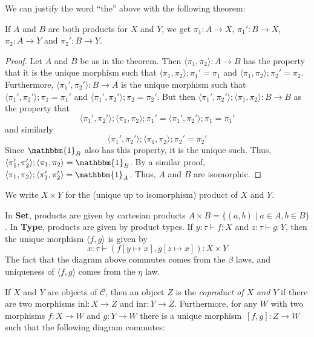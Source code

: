 \documentclass{lecturenotes}
\newcommand{\id}[1][]{\ensuremath{\mathbbm{1}_{#1}}}
\newcommand{\Set}{\textbf{Set}\xspace}
\newcommand{\Type}{\textbf{Type}\xspace}
\newcommand{\prodmor}[2]{\ensuremath{\langle #1, #2 \rangle}}
\newcommand{\inl}{\text{inl}\xspace}
\newcommand{\inr}{\text{inr}\xspace}
\newcommand{\coprodmor}[2]{\ensuremath{[ #1, #2 ]}}
\begin{document}
We can justify the word ``the'' above with the following theorem:
\begin{thm}
  If $A$ and $B$ are both products for $X$ and $Y$, we get $\pi_1 : A \to X$, $\pi_1' : B \to X$, $\pi_2 : A \to Y$ and $\pi_2' : B \to Y$.
\end{thm}
\begin{proof}
  Let $A$ and $B$ be as in the theorem.
  Then $\prodmor{\pi_1}{\pi_2} : A \to B$ has the property that it is the unique morphism such that $\prodmor{\pi_1}{\pi_2}; \pi_1' = \pi_1$ and $\prodmor{\pi_1}{\pi_2}; \pi_2' = \pi_2$.
  Furthermore, $\prodmor{\pi_1'}{\pi_2'} : B \to A$ is the unique morphism such that $\prodmor{\pi_1'}{\pi_2'}; \pi_1 = \pi_1'$ and $\prodmor{\pi_1'}{\pi_2'};\pi_2 = \pi_2'$.
  But then $\prodmor{\pi_1'}{\pi_2'}; \prodmor{\pi_1}{\pi_2} : B \to B$ as the property that $$\prodmor{\pi_1'}{\pi_2'}; \prodmor{\pi_1}{\pi_2}; \pi_1' = \prodmor{\pi_1'}{\pi_2'}; \pi_1 = \pi_1'$$ and similarly $$\prodmor{\pi_1'}{\pi_2'}; \prodmor{\pi_1}{\pi_2}; \pi_2' = \pi_2'$$
  Since $\id[B]$ also has this property, it is the unique such.
  Thus, $\prodmor{\pi_1'}{\pi_2'}; \prodmor{\pi_1}{\pi_2} = \id[B]$.
  By a similar proof, $\prodmor{\pi_1}{\pi_2}; \prodmor{\pi_1'}{\pi_2'} = \id[A]$.
  Thus, $A$ and $B$ are isomorphic.
\end{proof}

We write $X \times Y$ for the (unique up to isomorphism) product of $X$ and $Y$.

In \Set, products are given by cartesian products $A \times B = \{(a, b) \mid a \in A, b \in B\}$.
In \Type, products are given by product types.
If $y : \tau \vdash f : X$ and $z : \tau \vdash g : Y$, then the unique morphism $\prodmor{f}{g}$ is given by $$x : \tau \vdash(f[y \mapsto x], g[z \mapsto x]) : X \times Y$$
The fact that the diagram above commutes comes from the $\beta$ laws, and uniqueness of $\prodmor{f}{g}$ comes from the $\eta$ law.

\begin{defn}[Coproduct]
  If $X$ and $Y$ are objects of $\mathcal{C}$, then an object $Z$ is the \emph{coproduct of $X$ and $Y$} if there are two morphisms $\inl : X \to Z$ and $\inr : Y \to Z$.
  Furthermore, for any $W$ with two morphisms $f : X \to W$ and $g : Y \to W$ there is a unique morphism~$\coprodmor{f}{g} : Z
  \to W$ such that the following diagram commutes:
  \begin{center}
  \end{center}
\end{defn}
\end{document}
